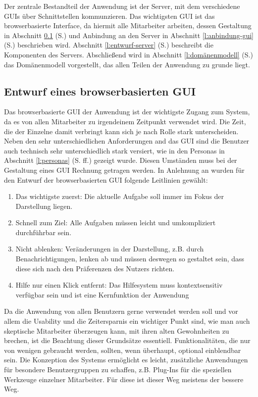 Der zentrale Bestandteil der Anwendung ist der Server, mit dem verschiedene GUIs über Schnittstellen kommunzieren. Das wichtigsten GUI ist das browserbasierte Interface, da hiermit alle Mitarbeiter arbeiten, dessen Gestaltung in Abschnitt \ref{l:entwurf-gui} (S.\pageref{l:entwurf-gui}) und Anbindung an den Server in Abschnitt \ref{l:anbindung-gui} (S.\pageref{l:anbindung-gui}) beschrieben wird. Abschnitt \ref{l:entwurf-server} (S.\pageref{l:entwurf-server}) beschreibt die Komponenten des Servers. Abschließend wird in Abschnitt \ref{l:domänenmodell} (S.\pageref{l:domänenmodell}) das Domänenmodell vorgestellt, das allen Teilen der Anwendung zu grunde liegt.

\subsection{Entwurf eines browserbasierten GUI}\label{l:entwurf-gui}

Das browserbasierte GUI der Anwendung ist der wichtigste Zugang zum System, da es von allen Mitarbeiter zu irgendeinem Zeitpunkt verwendet wird. Die Zeit, die der Einzelne damit verbringt kann sich je nach Rolle stark unterscheiden. Neben den sehr unterschiedlichen Anforderungen and das GUI sind die Benutzer auch technisch sehr unterschiedlich stark versiert, wie in den Personas in Abschnitt \ref{l:personas} (S.\pageref{l:personas} ff.) gezeigt wurde. Diesen Umständen muss bei der Gestaltung eines GUI Rechnung getragen werden. In Anlehnung an \cite{nielsen} wurden für den Entwurf der browserbasierten GUI folgende Leitlinien gewählt:

\begin{enumerate}\itemsep -5pt
\item{Das wichtigste zuerst: Die aktuelle Aufgabe soll immer im Fokus der Darstellung liegen.}
\item{Schnell zum Ziel: Alle Aufgaben müssen leicht und umkompliziert durchführbar sein.}
\item{Nicht ablenken: Veränderungen in der Darstellung, z.B. durch Benachrichtigungen, lenken ab und müssen deswegen so gestaltet sein, dass diese sich nach den Präferenzen des Nutzers richten.}
\item{Hilfe nur einen Klick entfernt: Das Hilfesystem muss kontextsensitiv verfügbar sein und ist eine Kernfunktion der Anwendung}
\end{enumerate}

Da die Anwendung von allen Benutzern gerne verwendet werden soll und vor allem die Usability und die Zeitersparnis ein wichtiger Punkt sind, wie man auch skeptische Mitarbeiter überzeugen kann, mit ihren alten Gewohnheiten zu brechen, ist die Beachtung dieser Grundsätze essentiell. Funktionalitäten, die nur von wenigen gebraucht werden, sollten, wenn überhaupt, optional einblendbar sein. Die Konzeption des Systems ermöglicht es leicht, zusätzliche Anwendungen für besondere Benutzergruppen zu schaffen, z.B. Plug-Ins für die speziellen Werkzeuge einzelner Mitarbeiter. Für diese  ist dieser Weg meistens der bessere Weg.

